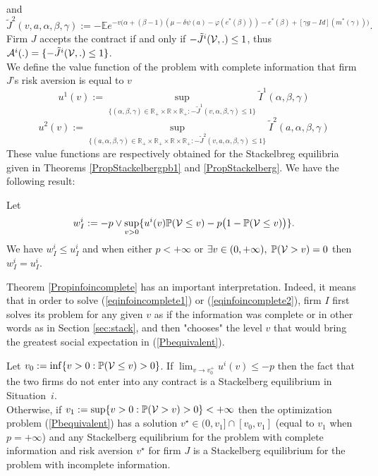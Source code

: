 \documentclass{svjour3}
\begin{document}
 and
 \begin{equation}
 \label{deftJv2}
\tilde J^2(v,a,\alpha,\beta,\gamma):=
-{\mathbb{E}} e^{-v\big(\alpha
+(\beta-1)(\mu-\delta\psi(a)-\varphi(e^*(\beta)))-e^*(\beta)+
[\gamma g-Id](m^*(\gamma))\big)}.
\end{equation}
Firm $J$ accepts the contract if and only if $-{\tilde J^i}({\cal V},.)\leq 1$, thus ${\cal A}^i(.)=\{-{\tilde J^i}({\cal V},.)\leq 1\}$.\\
We define  the value function of the problem with complete information that firm $J$'s risk aversion is equal to $v$ $$u^1(v):=\sup_{\{(\alpha,\beta,\gamma)\in\mathbb{R}_+\times\mathbb{R}\times\mathbb{R}_+:- \tilde J^1(v,\alpha,\beta,\gamma)\leq 1\}}\tilde I^1(\alpha,\beta,\gamma)$$
$$u^2(v):=\sup_{\{(a,\alpha,\beta,\gamma)\in\mathbb{R}_+\times\mathbb{R}_+\times\mathbb{R}\times\mathbb{R}_+:-\tilde J^2(v,a,\alpha,\beta,\gamma)\leq 1\}}\tilde I^2(a,\alpha,\beta,\gamma)$$
These value functions are  respectively obtained for the Stackelbreg equilibria given in Theorems \ref{PropStackelbergpb1} and \ref{PropStackelberg}. We have the following result:
\begin{theorem}
\label{Propinfoincomplete}
Let \begin{equation}
\label{Pbequivalent}
 w^i_I:=-p\vee \sup_{v>0}\{u^i(v){\mathbb{P}}({\cal V}\leq v)-p\big(1-{\mathbb{P}}({\cal V}\leq v)\big)\}.
 \end{equation}
We have $w^i_I\leq u^i_I$ and when either $p<+\infty$ or $\exists v\in (0,+\infty),\;{\mathbb{P}}({\cal V}>v)=0$ then $w^i_I=u^i_I$.
\end{theorem}
Theorem \ref{Propinfoincomplete} has an important interpretation. Indeed, it means
 that in order to solve (\ref{eqinfoincomplete1}) or (\ref{eqinfoincomplete2}), firm $I$
  first solves its problem for any given $v$ as if the information was complete or in 
  other words as in Section \ref{sec:stack}, and then "chooses" the level $v$ that would 
  bring the greatest social expectation in (\ref{Pbequivalent}).

\vspace{2mm}

\begin{theorem}
\label{Th:stackincomplet} 
Let $v_0:=\inf\{v>0:{\mathbb{P}}({\cal V}\leq v)>0\}$. If $\lim_{v\to v_0^+}u^i(v)\leq -p$ then the fact 
that the two firms do not enter into any contract is a Stackelberg equilibrium in Situation~$i$.
\\
Otherwise, if $v_1:=\sup\{v>0:{\mathbb{P}}({\cal V}>v)>0\}<+\infty$ then the optimization problem
 (\ref{Pbequivalent}) has a solution $v^\star\in (0,v_1]\cap [v_0,v_1]$ (equal to $v_1$ when $p=+\infty$) and any Stackelberg equilibrium for the problem with complete information and risk aversion $v^\star$ for firm $J$ is a Stackelberg equilibrium for the problem with incomplete information.
 \end{theorem}
\end{document}
